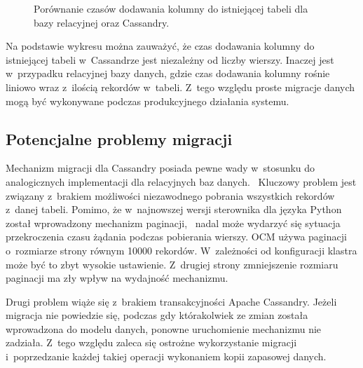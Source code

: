 \begin{figure}[ht!]
	\centering

	\caption{Porównanie czasów dodawania kolumny do istniejącej tabeli dla bazy relacyjnej oraz Cassandry.}
	\label{fig:simple_migration_performance_test}
\end{figure}

Na podstawie wykresu można zauważyć, że czas dodawania kolumny do istniejącej tabeli w~Cassandrze jest niezależny od liczby wierszy. Inaczej jest w~przypadku relacyjnej bazy danych, gdzie czas dodawania kolumny rośnie liniowo wraz z~ilością rekordów w~tabeli. Z~tego względu proste migracje danych mogą być wykonywane podczas produkcyjnego działania systemu. 

\subsection{Potencjalne problemy migracji}

Mechanizm migracji dla Cassandry posiada pewne wady w~stosunku do analogicznych implementacji dla relacyjnych baz danych.~\cite{django_migrations} Kluczowy problem jest związany z~brakiem możliwości niezawodnego pobrania  wszystkich rekordów z~danej tabeli. Pomimo, że w~najnowszej wersji sterownika dla języka Python został wprowadzony mechanizm paginacji,~\cite{python_driver_pagination} nadal może wydarzyć się sytuacja przekroczenia czasu żądania podczas pobierania wierszy. OCM używa paginacji o~rozmiarze strony równym 10000 rekordów. W~zależności od konfiguracji klastra może być to zbyt wysokie ustawienie. Z~drugiej strony zmniejszenie rozmiaru paginacji ma zły wpływ na wydajność mechanizmu.

Drugi problem wiąże się z~brakiem transakcyjności Apache Cassandry. Jeżeli migracja nie powiedzie się, podczas gdy którakolwiek ze zmian została wprowadzona do modelu danych, ponowne uruchomienie mechanizmu nie zadziała. Z~tego względu zaleca się ostrożne wykorzystanie migracji i~poprzedzanie każdej takiej operacji wykonaniem kopii zapasowej danych. 

